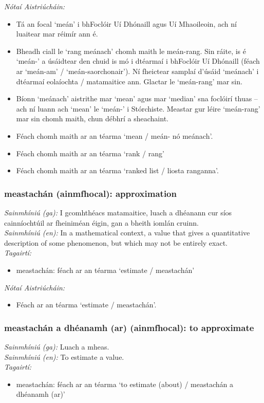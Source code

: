\documentclass{article}
\begin{document}
 \noindent \textit{Nótaí Aistriúcháin:}
\begin{itemize}
	\item Tá an focal `meán' i bhFoclóir Uí Dhónaill agus Uí Mhaoileoin, ach ní luaitear mar réimír ann é.
	\item Bheadh ciall le `rang meánach' chomh maith le meán-rang. Sin ráite, is é `meán-' a úsáidtear den chuid is mó i dtéarmaí i bhFoclóir Uí Dhónaill (féach ar `meán-am' / `meán-saorchonair'). Ní fheictear samplaí d'úsáid `meánach' i dtéarmaí eolaíochta / matamaitice ann. Glactar le `meán-rang' mar sin.
	\item Bíonn `meánach' aistrithe mar `mean' agus mar `median' sna foclóirí thuas -- ach ní luann ach `mean' le `meán-' i Stórchiste. Meastar gur léire `meán-rang' mar sin chomh maith, chun débhrí a sheachaint.
	\item Féach chomh maith ar an téarma `mean / meán- nó meánach'.
	\item Féach chomh maith ar an téarma `rank / rang'
	\item Féach chomh maith ar an téarma `ranked list / liosta ranganna'.
\end{itemize}


\subsubsection*{meastachán (ainmfhocal): approximation}
 \noindent \textit{Sainmhíniú (ga):} I gcomhthéacs matamaitice, luach a dhéanann cur síos cainníochtúil ar fheiniméan éigin, gan a bheith iomlán cruinn.
\\
 \noindent \textit{Sainmhíniú (en):} In a mathematical context, a value that gives a quantitative description of some phenomenon, but which may not be entirely exact.
\\
 \noindent \textit{Tagairtí:}
\begin{itemize}
	\item meastachán: féach ar an téarma `estimate / meastachán'
\end{itemize}

 \noindent \textit{Nótaí Aistriúcháin:}
\begin{itemize}
	\item Féach ar an téarma `estimate / meastachán'.
\end{itemize}


\subsubsection*{meastachán a dhéanamh (ar) (ainmfhocal): to approximate}
 \noindent \textit{Sainmhíniú (ga):} Luach a mheas.
\\
 \noindent \textit{Sainmhíniú (en):} To estimate a value.
\\
 \noindent \textit{Tagairtí:}
\begin{itemize}
	\item meastachán: féach ar an téarma `to estimate (about) / meastachán a dhéanamh (ar)'
\end{itemize}
\end{document}
